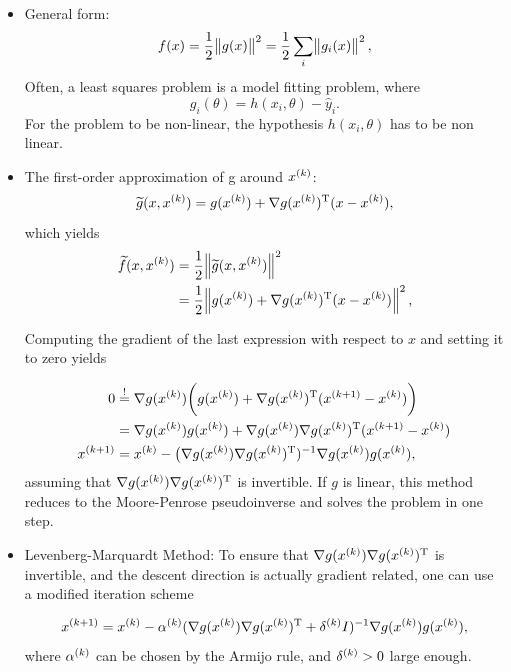 \documentclass[12pt,a4paper]{article}
\begin{document}
\begin{itemize}
    \item General form:
        \begin{equation*}
          f(x) = \frac{1}{2} \enVert[1]{g(x)}^2 = \frac{1}{2} \sum_i \enVert[1]{g_i(x)}^2,
        \end{equation*}
        Often, a least squares problem is a model fitting problem, where
        \begin{equation*}
          g_i(\theta) = h(x_i, \theta) - \hat{y}_i.
        \end{equation*}
    For the problem to be non-linear, the hypothesis $h(x_i, \theta)$ has to be non linear.
    
    \item The first-order approximation of g around $\kth{x}$:
        \begin{equation*}
         \widetilde{g}(x,\kth{x})=g(\kth{x}) + \nabla \T{g(\kth{x})} (x-\kth{x}),
        \end{equation*}
        which yields
        \begin{align*}
            \widetilde{f}(x,\kth{x}) &= \dfrac{1}{2} \norm{\widetilde{g}(x,\kth{x})}^2 
            \\ &=   \dfrac{1}{2} \norm{ g(\kth{x}) + \nabla \T{g(\kth{x})}(x-\kth{x})}^2,
        \end{align*}
        
        Computing the gradient of the last expression with respect to $x$ and setting it to zero yields
        
        \begin{align*}
            0 &\overset{!}{=}  \nabla g(\kth{x})\biggl(g(\kth{x}) +
                 \nabla \T{g(\kth{x})} (\kth[k+1]{x} - \kth{x})\biggr)
            \\ &= \nabla g(\kth{x})g(\kth{x}) +
                 \nabla g(\kth{x})\nabla \T{g(\kth{x})} (\kth[k+1]{x} - \kth{x})
            \\ \kth[k+1]{x} &= \kth{x} - \bigl ( \nabla g(\kth{x} ) \nabla \T{g(\kth{x})})^{-1}\nabla g(\kth{x})g(\kth{x}),
        \end{align*}
        assuming that $\nabla g(\kth{x})\nabla \T{g(\kth{x})}$ is invertible. If $g$ is linear, this method reduces
    to the Moore-Penrose pseudoinverse and solves the problem in one step.
    \item Levenberg-Marquardt Method: 
        To ensure that $\nabla g(\kth{x}) \nabla \T{g(\kth{x})}$ is invertible, and the descent direction is actually gradient related, one can use a modified iteration scheme

        \begin{equation*}
            \kth[k+1]{x} = \kth{x} - \kth{\alpha}(\nabla g( \kth{x}) \T{\nabla g( \kth{x})} + \kth{\delta}I)^{-1} \nabla g(\kth{x})g(\kth{x}),
        \end{equation*}
        where $\kth{\alpha}$ can be chosen by the Armijo rule, and $ \kth{\delta} > 0$ large enough.
\end{itemize}
\end{document}
